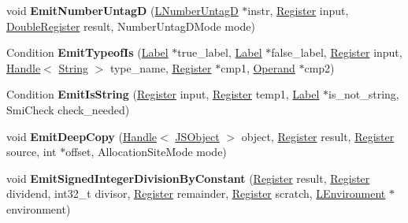 \begin{DoxyCompactItemize}
\item 
void {\bfseries Emit\+Number\+UntagD} (\hyperlink{classv8_1_1internal_1_1_l_number_untag_d}{L\+Number\+UntagD} $\ast$instr, \hyperlink{structv8_1_1internal_1_1_register}{Register} input, \hyperlink{structv8_1_1internal_1_1_double_register}{Double\+Register} result, Number\+Untag\+D\+Mode mode)\hypertarget{classv8_1_1internal_1_1_l_code_gen_afe9da04662b57d40a181108571021c8c}{}\label{classv8_1_1internal_1_1_l_code_gen_afe9da04662b57d40a181108571021c8c}

\item 
Condition {\bfseries Emit\+Typeof\+Is} (\hyperlink{classv8_1_1internal_1_1_label}{Label} $\ast$true\+\_\+label, \hyperlink{classv8_1_1internal_1_1_label}{Label} $\ast$false\+\_\+label, \hyperlink{structv8_1_1internal_1_1_register}{Register} input, \hyperlink{classv8_1_1internal_1_1_handle}{Handle}$<$ \hyperlink{classv8_1_1internal_1_1_string}{String} $>$ type\+\_\+name, \hyperlink{structv8_1_1internal_1_1_register}{Register} $\ast$cmp1, \hyperlink{classv8_1_1internal_1_1_operand}{Operand} $\ast$cmp2)\hypertarget{classv8_1_1internal_1_1_l_code_gen_a2d315dd7193e45c742f3cb0d5d06e1bc}{}\label{classv8_1_1internal_1_1_l_code_gen_a2d315dd7193e45c742f3cb0d5d06e1bc}

\item 
Condition {\bfseries Emit\+Is\+String} (\hyperlink{structv8_1_1internal_1_1_register}{Register} input, \hyperlink{structv8_1_1internal_1_1_register}{Register} temp1, \hyperlink{classv8_1_1internal_1_1_label}{Label} $\ast$is\+\_\+not\+\_\+string, Smi\+Check check\+\_\+needed)\hypertarget{classv8_1_1internal_1_1_l_code_gen_a23c72e27a6bf50a391c940939754673d}{}\label{classv8_1_1internal_1_1_l_code_gen_a23c72e27a6bf50a391c940939754673d}

\item 
void {\bfseries Emit\+Deep\+Copy} (\hyperlink{classv8_1_1internal_1_1_handle}{Handle}$<$ \hyperlink{classv8_1_1internal_1_1_j_s_object}{J\+S\+Object} $>$ object, \hyperlink{structv8_1_1internal_1_1_register}{Register} result, \hyperlink{structv8_1_1internal_1_1_register}{Register} source, int $\ast$offset, Allocation\+Site\+Mode mode)\hypertarget{classv8_1_1internal_1_1_l_code_gen_a1a84a4d1ebc9ba8736407dd2a6d1214a}{}\label{classv8_1_1internal_1_1_l_code_gen_a1a84a4d1ebc9ba8736407dd2a6d1214a}

\item 
void {\bfseries Emit\+Signed\+Integer\+Division\+By\+Constant} (\hyperlink{structv8_1_1internal_1_1_register}{Register} result, \hyperlink{structv8_1_1internal_1_1_register}{Register} dividend, int32\+\_\+t divisor, \hyperlink{structv8_1_1internal_1_1_register}{Register} remainder, \hyperlink{structv8_1_1internal_1_1_register}{Register} scratch, \hyperlink{classv8_1_1internal_1_1_l_environment}{L\+Environment} $\ast$environment)\hypertarget{classv8_1_1internal_1_1_l_code_gen_a921bba648571479bdcadde646b58c9ba}{}\label{classv8_1_1internal_1_1_l_code_gen_a921bba648571479bdcadde646b58c9ba}


\end{DoxyCompactItemize}
